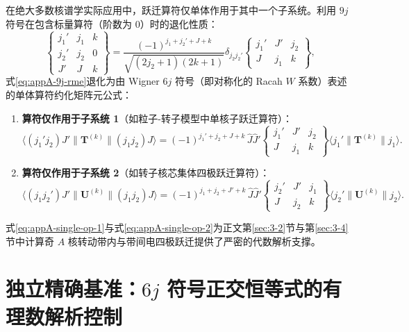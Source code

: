 在绝大多数核谱学实际应用中，跃迁算符仅单体作用于其中一个子系统。利用 $9j$ 符号在包含标量算符（阶数为 0）时的退化性质：
\begin{equation}\label{eq:appA-9j-to-6j}
\begin{Bmatrix} j_1' & j_1 & k \\ j_2' & j_2 & 0 \\ J' & J & k \end{Bmatrix} = \frac{(-1)^{j_1 + j_2' + J + k}}{\sqrt{(2j_2 + 1)(2k + 1)}} \delta_{j_2 j_2'} \begin{Bmatrix} j_1' & J' & j_2 \\ J & j_1 & k \end{Bmatrix} ,
\end{equation}
式\eqref{eq:appA-9j-rme}退化为由 Wigner $6j$ 符号（即对称化的 Racah $W$ 系数）表述的单体算符约化矩阵元公式：
\begin{enumerate}
\item \textbf{算符仅作用于子系统 1}（如粒子-转子模型中单核子跃迁算符）：
\begin{equation}\label{eq:appA-single-op-1}
\langle (j_1' j_2) J' \| \mathbf{T}^{(k)} \| (j_1 j_2) J \rangle = (-1)^{j_1' + j_2 + J + k} \, \hat{J} \hat{J}' \begin{Bmatrix} j_1' & J' & j_2 \\ J & j_1 & k \end{Bmatrix} \langle j_1' \| \mathbf{T}^{(k)} \| j_1 \rangle .
\end{equation}
\item \textbf{算符仅作用于子系统 2}（如转子核芯集体四极跃迁算符）：
\begin{equation}\label{eq:appA-single-op-2}
\langle (j_1 j_2') J' \| \mathbf{U}^{(k)} \| (j_1 j_2) J \rangle = (-1)^{j_1 + j_2 + J' + k} \, \hat{J} \hat{J}' \begin{Bmatrix} j_2' & J' & j_1 \\ J & j_2 & k \end{Bmatrix} \langle j_2' \| \mathbf{U}^{(k)} \| j_2 \rangle .
\end{equation}
\end{enumerate}
式\eqref{eq:appA-single-op-1}与式\eqref{eq:appA-single-op-2}为正文第\ref{sec:3-2}节与第\ref{sec:3-4}节中计算奇 $A$ 核转动带内与带间电四极跃迁提供了严密的代数解析支撑。

\section{独立精确基准：$6j$ 符号正交恒等式的有理数解析控制}\label{sec:appA-4}

